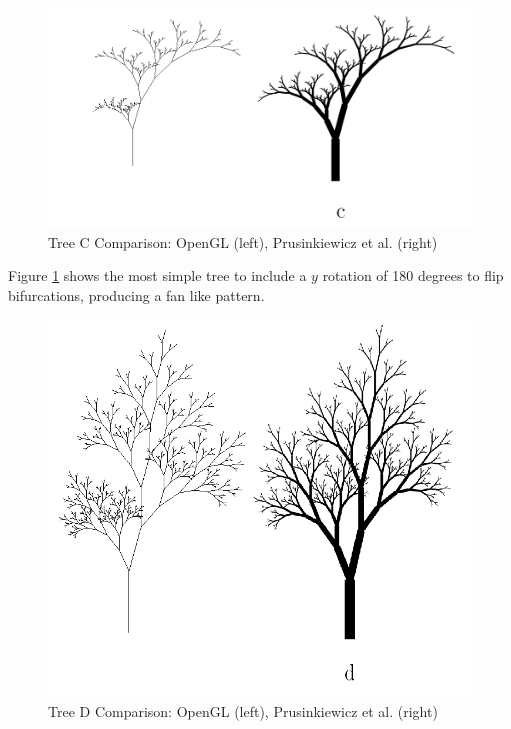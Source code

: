 \documentclass[final]{cmpreport}
\begin{document}
\begin{figure}[ht]
    \includegraphics[scale=0.4]{tree-comp-c.png} 
    \centering
    \captionsetup{justification=centering}
    \caption{Tree C Comparison: OpenGL (left), Prusinkiewicz et al. (right)}
    \label{fig:tree-comp-c}
\end{figure}

Figure \ref{fig:tree-comp-c} shows the most simple tree to include a $y$ rotation of 180 degrees to flip 
bifurcations, producing a fan like pattern.

\begin{figure}[ht]
    \includegraphics[scale=0.4]{tree-comp-d.png} 
    \centering
    \captionsetup{justification=centering}
    \caption{Tree D Comparison: OpenGL (left), Prusinkiewicz et al. (right)}
    \label{fig:tree-comp-d}
\end{figure}
\end{document}
